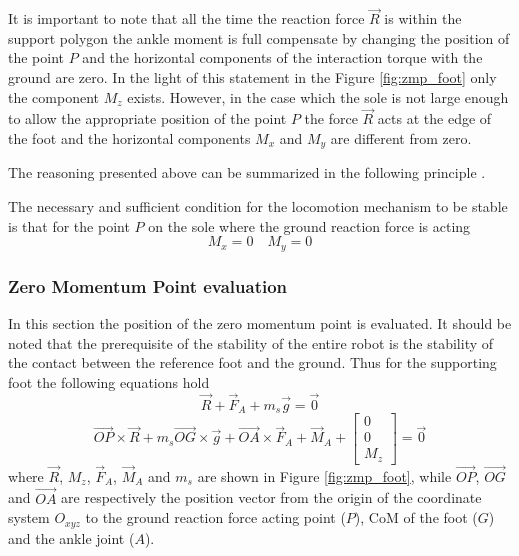 It is important to note that all the time the reaction force $\vec{R}$ is within the support polygon
the ankle moment is full compensate by changing the position of the point $P$ and the horizontal
components of the interaction torque with the ground are zero. In the light of this statement in the
Figure \ref{fig:zmp_foot} only the component $M_z$ exists.
However, in the case which the sole is not large enough to allow the appropriate position of the
point $P$ the force $\vec{R}$ acts at the edge of the foot and the horizontal components $M_x$ and
$M_y$ are different from zero.
\par
The reasoning presented above can be summarized in the following principle \cite{Vukobratov2004}.
\begin{principle}
  The necessary and sufficient condition for the locomotion mechanism to be stable
  is that for the point $P$ on the sole where the ground reaction force is acting
  \[
  M_x = 0 \quad M_y = 0
  \]
\end{principle}
\subsubsection{Zero Momentum Point evaluation}
In this section the position of the zero momentum point is evaluated. It should be noted that the
prerequisite of the stability of the entire robot is the stability of the contact between the
reference foot and the ground. Thus for the supporting foot the following equations hold 
\[
\vec{R} + \vec{F}_A + m_s \vec{g} = \vec{0}
\]
\begin{equation}
  \label{eq:zmp_2_cardinal}
  \vec{OP} \times \vec{R} + m_s \vec{OG} \times \vec{g} + \vec{OA} \times \vec{F}_A + \vec{M}_A +
  \begin{bmatrix}
    0 \\
    0 \\
    M_z
  \end{bmatrix} = \vec{0}
\end{equation}
where $\vec{R}$, $M_z$, $\vec{F}_A$, $\vec{M}_A$ and $m_s$ are shown in Figure
\ref{fig:zmp_foot}, while $\vec{OP}$, $\vec{OG}$ and $\vec{OA}$ are respectively the position vector
from the origin of the coordinate system $O_{xyz}$ to the ground reaction force acting point ($P$),
CoM of the foot ($G$) and the ankle joint ($A$).
\par

